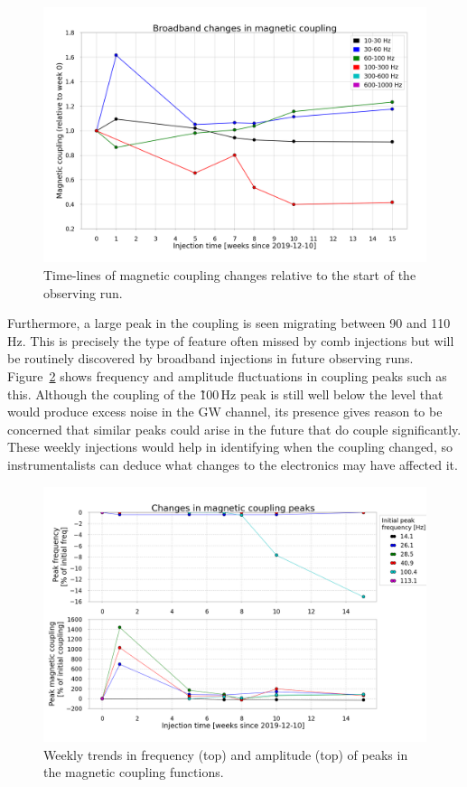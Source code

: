 \begin{figure}[h]
	\centering
	\includegraphics[width=\textwidth]{figures/noise-studies/mag-weekly-bands.png}
	\caption{Time-lines of magnetic coupling changes relative to the start of the observing run.}
	\label{fig:mag-weekly-bands}
\end{figure}

Furthermore, a large peak in the coupling is seen migrating between 90 and 110 Hz.
This is precisely the type of feature often missed by comb injections but will be routinely discovered by broadband injections in future observing runs.
Figure~\ref{fig:mag-weekly-peaks} shows frequency and amplitude fluctuations in coupling peaks such as this.
Although the coupling of the \~100\,Hz peak is still well below the level that would produce excess noise in the \ac{GW} channel, its presence gives reason to be concerned that similar peaks could arise in the future that do couple significantly.
These weekly injections would help in identifying when the coupling changed, so instrumentalists can deduce what changes to the electronics may have affected it.

\begin{figure}[h]
	\centering
	\includegraphics[width=\textwidth]{figures/noise-studies/mag-weekly-peaks.png}
	\caption{Weekly trends in frequency (top) and amplitude (top) of peaks in the magnetic coupling functions.}
	\label{fig:mag-weekly-peaks}
\end{figure}


